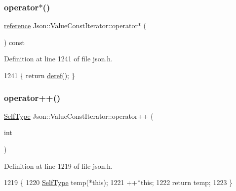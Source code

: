 \subsubsection{\texorpdfstring{operator$\ast$()}{operator*()}}
{\footnotesize\ttfamily \hyperlink{class_json_1_1_value_const_iterator_aa9b05c6a37cd352ea1ee6e13b816f709}{reference} Json\+::\+Value\+Const\+Iterator\+::operator$\ast$ (\begin{DoxyParamCaption}{ }\end{DoxyParamCaption}) const\hspace{0.3cm}{\ttfamily [inline]}}



Definition at line 1241 of file json.\+h.


\begin{DoxyCode}
1241 \{ \textcolor{keywordflow}{return} \hyperlink{class_json_1_1_value_iterator_base_aa5b75c9514a30ba2ea3c9a35c165c18e}{deref}(); \}
\end{DoxyCode}
\mbox{\label{class_json_1_1_value_const_iterator_ab3f0c2edbfc8f7d60645f3d597d05e28}} 
\subsubsection{\texorpdfstring{operator++()}{operator++()}\hspace{0.1cm}{\footnotesize\ttfamily [1/2]}}
{\footnotesize\ttfamily \hyperlink{class_json_1_1_value_iterator_base_a9d2a940d03ea06d20d972f41a89149ee}{Self\+Type} Json\+::\+Value\+Const\+Iterator\+::operator++ (\begin{DoxyParamCaption}\item[{int}]{ }\end{DoxyParamCaption})\hspace{0.3cm}{\ttfamily [inline]}}



Definition at line 1219 of file json.\+h.


\begin{DoxyCode}
1219                            \{
1220     \hyperlink{class_json_1_1_value_const_iterator_a0c2e33e7eb5a80dd8709fb28ece83933}{SelfType} temp(*\textcolor{keyword}{this});
1221     ++*\textcolor{keyword}{this};
1222     \textcolor{keywordflow}{return} temp;
1223   \}
\end{DoxyCode}
\mbox{\label{class_json_1_1_value_const_iterator_a2cfe2f7a94a688186efdafb1b181c319}} 
